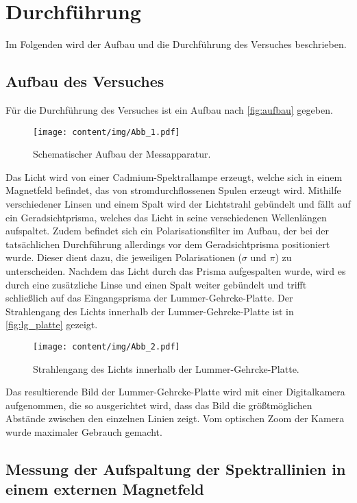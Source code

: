 \section{Durchführung}
\label{sec:durchfuehrung}
Im Folgenden wird der Aufbau und die Durchführung des Versuches beschrieben.


\subsection{Aufbau des Versuches}

Für die Durchführung des Versuches ist ein Aufbau nach \autoref{fig:aufbau} gegeben.
\begin{figure}[H]
    \centering
    \texttt{[image: content/img/Abb\_1.pdf]}
    \caption{Schematischer Aufbau der Messapparatur. \cite{versuchsanleitung}}
    \label{fig:aufbau}
\end{figure}

Das Licht wird von einer Cadmium-Spektrallampe erzeugt,
welche sich in einem Magnetfeld befindet,
das von stromdurchflossenen Spulen erzeugt wird.
Mithilfe verschiedener Linsen und einem Spalt wird der Lichtstrahl gebündelt und fällt auf ein Geradsichtprisma,
welches das Licht in seine verschiedenen Wellenlängen aufspaltet.
Zudem befindet sich ein Polarisationsfilter im Aufbau,
der bei der tatsächlichen Durchführung allerdings vor dem Geradsichtprisma positioniert wurde.
Dieser dient dazu,
die jeweiligen Polarisationen ($\sigma$ und $\pi$) zu unterscheiden.
Nachdem das Licht durch das Prisma aufgespalten wurde,
wird es durch eine zusätzliche Linse und einen Spalt weiter gebündelt und trifft schließlich auf das Eingangsprisma der Lummer-Gehrcke-Platte.
Der Strahlengang des Lichts innerhalb der Lummer-Gehrcke-Platte ist in \autoref{fig:lg_platte} gezeigt.
\begin{figure}[H]
    \centering
    \texttt{[image: content/img/Abb\_2.pdf]}
    \caption{Strahlengang des Lichts innerhalb der Lummer-Gehrcke-Platte. \cite{versuchsanleitung}}
    \label{fig:lg_platte}
\end{figure}
Das resultierende Bild der Lummer-Gehrcke-Platte wird mit einer Digitalkamera aufgenommen,
die so ausgerichtet wird,
dass das Bild die größtmöglichen Abstände zwischen den einzelnen Linien zeigt.
Vom optischen Zoom der Kamera wurde maximaler Gebrauch gemacht.


\subsection{Messung der Aufspaltung der Spektrallinien in einem externen Magnetfeld}

